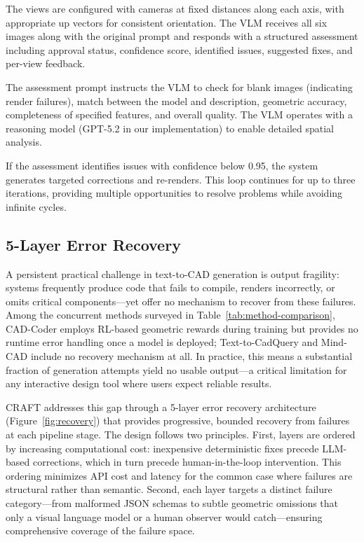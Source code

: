 \documentclass[5p,twocolumn,10pt,times]{elsarticle}
\begin{document}
The views are configured with cameras at fixed distances along each axis, with appropriate up vectors for consistent orientation. The VLM receives all six images along with the original prompt and responds with a structured assessment including approval status, confidence score, identified issues, suggested fixes, and per-view feedback.

The assessment prompt instructs the VLM to check for blank images (indicating render failures), match between the model and description, geometric accuracy, completeness of specified features, and overall quality. The VLM operates with a reasoning model (GPT-5.2 in our implementation) to enable detailed spatial analysis.

If the assessment identifies issues with confidence below 0.95, the system generates targeted corrections and re-renders. This loop continues for up to three iterations, providing multiple opportunities to resolve problems while avoiding infinite cycles.

\subsection{5-Layer Error Recovery}
\label{subsec:recovery}

A persistent practical challenge in text-to-CAD generation is output fragility: systems frequently produce code that fails to compile, renders incorrectly, or omits critical components---yet offer no mechanism to recover from these failures. Among the concurrent methods surveyed in Table~\ref{tab:method-comparison}, CAD-Coder employs RL-based geometric rewards during training but provides no runtime error handling once a model is deployed; Text-to-CadQuery and Mind-CAD include no recovery mechanism at all. In practice, this means a substantial fraction of generation attempts yield no usable output---a critical limitation for any interactive design tool where users expect reliable results.

CRAFT addresses this gap through a 5-layer error recovery architecture (Figure~\ref{fig:recovery}) that provides progressive, bounded recovery from failures at each pipeline stage. The design follows two principles. First, layers are ordered by increasing computational cost: inexpensive deterministic fixes precede LLM-based corrections, which in turn precede human-in-the-loop intervention. This ordering minimizes API cost and latency for the common case where failures are structural rather than semantic. Second, each layer targets a distinct failure category---from malformed JSON schemas to subtle geometric omissions that only a visual language model or a human observer would catch---ensuring comprehensive coverage of the failure space.
\end{document}
